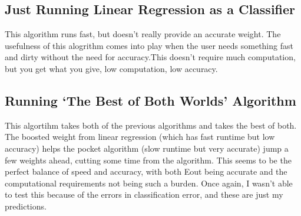 \documentclass[a4paper]{article}
\begin{document}
\subsection{Just Running Linear Regression as a Classifier}
This algorithm runs fast, but doesn't really provide an accurate weight. The usefulness of this alogrithm comes into play when the user needs something fast and dirty without the need for accuracy.This doesn't require much computation, but you get what you give, low computation, low accuracy.

\subsection{Running `The Best of Both Worlds' Algorithm }
This algortihm takes both of the previous algorithms and takes the best of both. The boosted weight from linear regression (which has fast runtime but low accuracy) helps the pocket algorithm (slow runtime but very accurate) jump a few weights ahead, cutting some time from the algorithm. This seems to be the perfect balance of speed and accuracy, with both Eout being accurate and the computational requirements not being such a burden. Once again, I wasn't able to test this because of the errors in classification error, and these are just my predictions.
\end{document}
